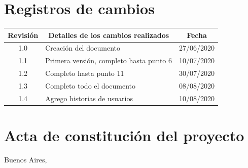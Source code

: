 \documentclass[11pt]{charter}
\begin{document}
\maketitle
\thispagestyle{empty}
\pagebreak


\thispagestyle{empty}
{\setlength{\parskip}{0pt}
\tableofcontents{}
}
\pagebreak


\section{Registros de cambios}
\label{sec:registro}


\begin{table}[ht]
\label{tab:registro}
\centering

\begin{tabularx}{\linewidth}{@{}|c|X|c|@{}}
\hline
\rowcolor[HTML]{CBCEFB} 
Revisión & \multicolumn{1}{c|}{\cellcolor[HTML]{CBCEFB}Detalles de los cambios realizados} & Fecha\\ \hline
1.0      & Creación del documento                                                          
		 & 27/06/2020 \\ \hline
1.1      & Primera versión, completo hasta punto 6                                                                                         	 	 & 10/07/2020 \\ \hline
1.2      & Completo hasta punto 11 																						   	 & 30/07/2020 \\ \hline
1.3      & Completo todo el documento 																						 & 08/08/2020 \\ \hline  
1.4      & Agrego historias de usuarios 																				     & 10/08/2020 \\ \hline                                                                   
\end{tabularx}
\end{table}

\pagebreak



\section{Acta de constitución del proyecto}
\label{sec:acta}

\begin{flushright}
Buenos Aires, \fechaInicioName
\end{flushright}

\vspace{2cm}
\end{document}
